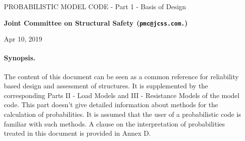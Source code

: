\documentclass[%
oneside,                 %
final,                   %
10pt]{article}
\begin{document}

\newcommand{\exercisesection}[1]{\subsection*{#1}}









\thispagestyle{empty}

\begin{center}
{\LARGE\bf
\begin{spacing}{1.25}
PROBABILISTIC MODEL CODE - Part 1 - Basis of Design
\end{spacing}
}
\end{center}


\begin{center}
{\bf Joint Committee on Structural Safety${}^{}$ (\texttt{pmc@jcss.com.})} \\ [0mm]
\end{center}

\begin{center}
\end{center}
    

\begin{center}
Apr 10, 2019
\end{center}

\vspace{1cm}


\paragraph{Synopsis.}
The content of this document can be seen as a common reference for reliability based design and assessment of structures. It is supplemented by the corresponding Parts II - Load Models and III - Resistance Models of the model code. This part doesn’t give detailed information about methods for the calculation of probabilities. It is assumed that the user of a probabilistic code is familiar with such methods. A clause on the interpretation of probabilities treated in this document is provided in Annex D.
\end{document}
